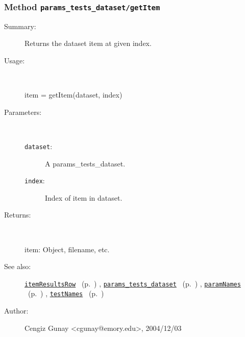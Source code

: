 \subsubsection[Method \texttt{getItem}]{Method \texttt{params\_tests\_dataset/getItem}}%
%
\label{ref_params_tests_dataset__getItem}%
\hypertarget{ref_params_tests_dataset__getItem}{}%
\begin{description}
\item[Summary:]Returns the dataset item at given index.
%
\item[Usage:]~%
\begin{lyxcode}%
item = getItem(dataset, index)
%
\end{lyxcode}%
%
%
\item[Parameters:]~
\begin{description}%
\item[\texttt{dataset}:]
 A params\_tests\_dataset.
\item[\texttt{index}:]
 Index of item in dataset.
\end{description}%
%
\item[Returns:
]~

	item: Object, filename, etc.
%
%
\item[See also:]%
\hyperlink{ref_itemResultsRow}{\texttt{itemResultsRow}}%
\ (p.~\pageref{ref_itemResultsRow})%
%
, \hyperlink{ref_params_tests_dataset}{\texttt{params\_tests\_dataset}}%
\ (p.~\pageref{ref_params_tests_dataset})%
%
, \hyperlink{ref_paramNames}{\texttt{paramNames}}%
\ (p.~\pageref{ref_paramNames})%
%
, \hyperlink{ref_testNames}{\texttt{testNames}}%
\ (p.~\pageref{ref_testNames})%
%
%
\item[Author:]%
Cengiz Gunay <cgunay@emory.edu>, 2004/12/03
%
\end{description}
\methodline%
